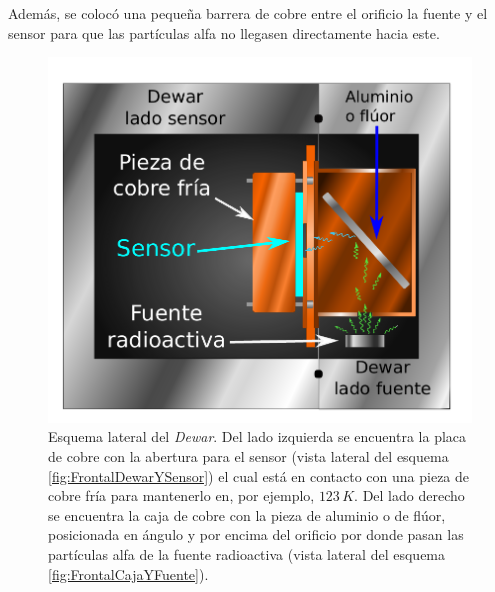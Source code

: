 Además, se colocó una pequeña barrera de cobre entre el orificio la fuente y el sensor para que las partículas alfa no llegasen directamente hacia este.
\begin{figure}%
    \centering
    \includegraphics[scale=0.7]{Figs/LateralDewar.pdf}
    \caption{\footnotesize{Esquema lateral del \textit{Dewar}. Del lado izquierda se encuentra la placa de cobre con la abertura para el sensor (vista lateral del esquema \ref{fig:FrontalDewarYSensor}) el cual está en contacto con una pieza de cobre fría para mantenerlo en, por ejemplo, $123\,\si{K}$. Del lado derecho se encuentra la caja de cobre con la pieza de aluminio o de flúor, posicionada en ángulo y por encima del orificio por donde pasan las partículas alfa de la fuente radioactiva (vista lateral del esquema \ref{fig:FrontalCajaYFuente}).}}
    \label{fig:LateralDewar}
\end{figure}
